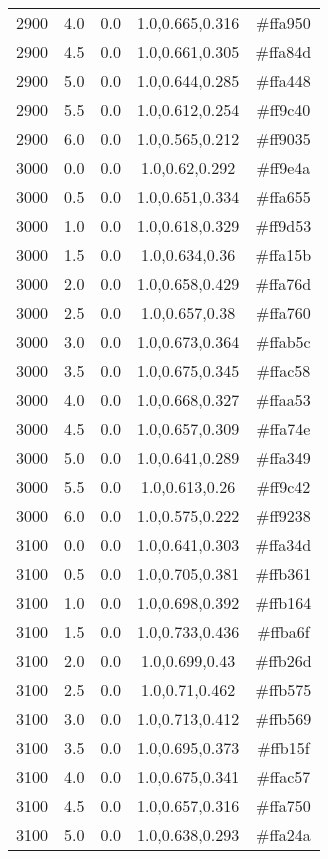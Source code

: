 \begin{tabular}{ccccc}
2900 & 4.0 & 0.0 & 1.0,0.665,0.316 & \#ffa950 \\ 
2900 & 4.5 & 0.0 & 1.0,0.661,0.305 & \#ffa84d \\ 
2900 & 5.0 & 0.0 & 1.0,0.644,0.285 & \#ffa448 \\ 
2900 & 5.5 & 0.0 & 1.0,0.612,0.254 & \#ff9c40 \\ 
2900 & 6.0 & 0.0 & 1.0,0.565,0.212 & \#ff9035 \\ 
3000 & 0.0 & 0.0 & 1.0,0.62,0.292 & \#ff9e4a \\ 
3000 & 0.5 & 0.0 & 1.0,0.651,0.334 & \#ffa655 \\ 
3000 & 1.0 & 0.0 & 1.0,0.618,0.329 & \#ff9d53 \\ 
3000 & 1.5 & 0.0 & 1.0,0.634,0.36 & \#ffa15b \\ 
3000 & 2.0 & 0.0 & 1.0,0.658,0.429 & \#ffa76d \\ 
3000 & 2.5 & 0.0 & 1.0,0.657,0.38 & \#ffa760 \\ 
3000 & 3.0 & 0.0 & 1.0,0.673,0.364 & \#ffab5c \\ 
3000 & 3.5 & 0.0 & 1.0,0.675,0.345 & \#ffac58 \\ 
3000 & 4.0 & 0.0 & 1.0,0.668,0.327 & \#ffaa53 \\ 
3000 & 4.5 & 0.0 & 1.0,0.657,0.309 & \#ffa74e \\ 
3000 & 5.0 & 0.0 & 1.0,0.641,0.289 & \#ffa349 \\ 
3000 & 5.5 & 0.0 & 1.0,0.613,0.26 & \#ff9c42 \\ 
3000 & 6.0 & 0.0 & 1.0,0.575,0.222 & \#ff9238 \\ 
3100 & 0.0 & 0.0 & 1.0,0.641,0.303 & \#ffa34d \\ 
3100 & 0.5 & 0.0 & 1.0,0.705,0.381 & \#ffb361 \\ 
3100 & 1.0 & 0.0 & 1.0,0.698,0.392 & \#ffb164 \\ 
3100 & 1.5 & 0.0 & 1.0,0.733,0.436 & \#ffba6f \\ 
3100 & 2.0 & 0.0 & 1.0,0.699,0.43 & \#ffb26d \\ 
3100 & 2.5 & 0.0 & 1.0,0.71,0.462 & \#ffb575 \\ 
3100 & 3.0 & 0.0 & 1.0,0.713,0.412 & \#ffb569 \\ 
3100 & 3.5 & 0.0 & 1.0,0.695,0.373 & \#ffb15f \\ 
3100 & 4.0 & 0.0 & 1.0,0.675,0.341 & \#ffac57 \\ 
3100 & 4.5 & 0.0 & 1.0,0.657,0.316 & \#ffa750 \\ 
3100 & 5.0 & 0.0 & 1.0,0.638,0.293 & \#ffa24a \\ 

\end{tabular}
